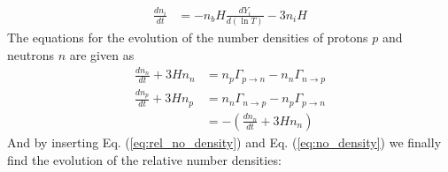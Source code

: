 \documentclass[reprint,english,notitlepage]{revtex4-1}  %
\numberwithin{equation}{section}
\begin{document}
\begin{align}
	\frac{d n_i}{dt} &= - n_b H \frac{dY_i}{d(\ln T)} - 3 n_i H
\end{align}
The equations for the evolution of the number densities of protons $p$ and
neutrons $n$ are given as
\begin{align}
	\frac{d n_n}{dt} + 3H n_n &= n_p \Gamma_{p\rightarrow n} - n_n\Gamma_{n\rightarrow p} \\
	\frac{d n_p}{dt} + 3H n_p &= n_n\Gamma_{n\rightarrow p} - n_p \Gamma_{p\rightarrow n}  \\
														&= - \left( \frac{d n_n}{dt} + 3H n_n \right)
\end{align}
And by inserting Eq. (\ref{eq:rel_no_density}) and Eq. (\ref{eq:no_density})
we finally find the evolution of the relative number densities:
\begin{align}

\end{align}
\end{document}
